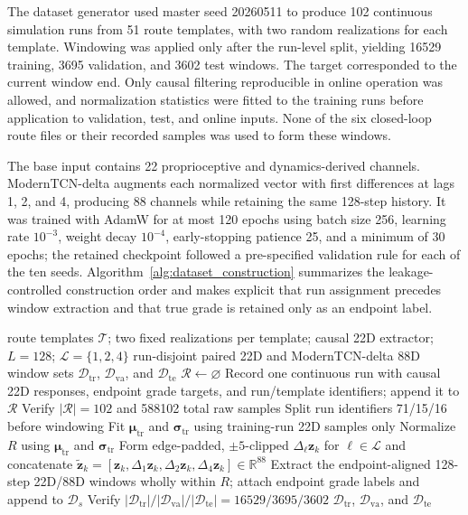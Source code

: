 \documentclass{ieeeaccess}
\begin{document}
The dataset generator used master seed 20260511 to produce 102 continuous simulation runs from 51 route templates, with two random realizations for each template. Windowing was applied only after the run-level split, yielding 16529 training, 3695 validation, and 3602 test windows. The target corresponded to the current window end. Only causal filtering reproducible in online operation was allowed, and normalization statistics were fitted to the training runs before application to validation, test, and online inputs. None of the six closed-loop route files or their recorded samples was used to form these windows.

The base input contains 22 proprioceptive and dynamics-derived channels. ModernTCN-delta augments each normalized vector with first differences at lags 1, 2, and 4, producing 88 channels while retaining the same 128-step history. It was trained with AdamW for at most 120 epochs using batch size 256, learning rate $10^{-3}$, weight decay $10^{-4}$, early-stopping patience 25, and a minimum of 30 epochs; the retained checkpoint followed a pre-specified validation rule for each of the ten seeds. Algorithm~\ref{alg:dataset_construction} summarizes the leakage-controlled construction order and makes explicit that run assignment precedes window extraction and that true grade is retained only as an endpoint label.

\begin{algorithm}[!t]
\caption{Leakage-controlled construction of run-disjoint 22D and 88D datasets}
\label{alg:dataset_construction}
\begin{algorithmic}[1]
 route templates $\mathcal T$; two fixed realizations per template; causal 22D extractor; $L=128$; $\mathcal L=\{1,2,4\}$
\Ensure run-disjoint paired 22D and ModernTCN-delta 88D window sets $\mathcal D_{\mathrm{tr}}$, $\mathcal D_{\mathrm{va}}$, and $\mathcal D_{\mathrm{te}}$
\State $\mathcal R\gets\varnothing$
    \State Record one continuous run with causal 22D responses, endpoint grade targets, and run/template identifiers; append it to $\mathcal R$
\EndFor
\State Verify $|\mathcal R|=102$ and 588102 total raw samples
\State Split run identifiers 71/15/16 before windowing 
\State Fit $\boldsymbol\mu_{\mathrm{tr}}$ and $\boldsymbol\sigma_{\mathrm{tr}}$ using training-run 22D samples only
    \State Normalize $R$ using $\boldsymbol\mu_{\mathrm{tr}}$ and $\boldsymbol\sigma_{\mathrm{tr}}$
    \State Form edge-padded, $\pm5$-clipped $\Delta_{\ell}\mathbf z_k$ for $\ell\in\mathcal L$ and concatenate $\widetilde{\mathbf z}_k=[\mathbf z_k,\Delta_1\mathbf z_k,\Delta_2\mathbf z_k,\Delta_4\mathbf z_k]\in\mathbb R^{88}$
    \State Extract the endpoint-aligned 128-step 22D/88D windows wholly within $R$; attach endpoint grade labels and append to $\mathcal D_s$
\EndFor
\State Verify $|\mathcal D_{\mathrm{tr}}|/|\mathcal D_{\mathrm{va}}|/|\mathcal D_{\mathrm{te}}|=16529/3695/3602$
\State \Return $\mathcal D_{\mathrm{tr}}$, $\mathcal D_{\mathrm{va}}$, and $\mathcal D_{\mathrm{te}}$
\end{algorithmic}
\end{algorithm}
\end{document}
